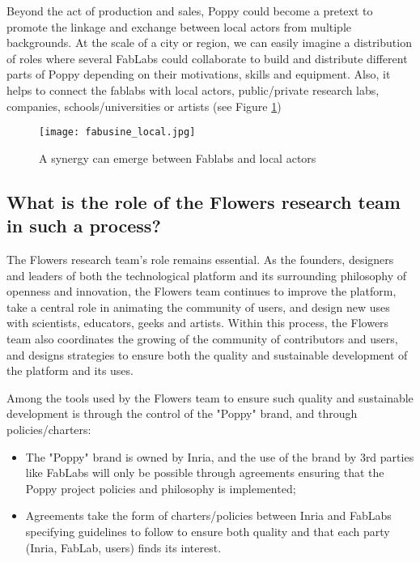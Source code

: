 Beyond the act of production and sales, Poppy could become a pretext to promote the linkage and exchange between local actors from multiple backgrounds. At the scale of a city or region, we can easily imagine a distribution of roles where several FabLabs could collaborate to build and distribute different parts of Poppy depending on their motivations, skills and equipment.
Also, it helps to connect the fablabs with local actors, public/private research labs, companies, schools/universities or artists (see Figure \ref{fig:local_synergy})

\begin{figure}[tb]
    \begin{center}
        \texttt{[image: fabusine\_local.jpg]}
    \end{center}
    \caption{A synergy can emerge between Fablabs and local actors}
    \label{fig:local_synergy}
\end{figure}

\subsection{What is the role of the Flowers research team in such a process? } %

The Flowers research team's role remains essential. As the founders, designers and leaders of both the technological platform and its surrounding philosophy of openness and innovation, the Flowers team continues to improve the platform, take a central role in animating the community of users, and design new uses with scientists, educators, geeks and artists. Within this process, the Flowers team also coordinates the growing of the community of contributors and users, and designs strategies to ensure both the quality and sustainable development of the platform and its uses.

Among the tools used by the Flowers team to ensure such quality and sustainable development is through the control of the "Poppy" brand, and through policies/charters:

\begin{itemize}
\item The "Poppy" brand is owned by Inria, and the use of the brand by 3rd parties like FabLabs will only be possible through agreements ensuring that the Poppy project policies and philosophy is implemented;
\item Agreements take the form of charters/policies between Inria and FabLabs specifying guidelines to follow to ensure both quality and that each party (Inria, FabLab, users) finds its interest.
\end{itemize}

